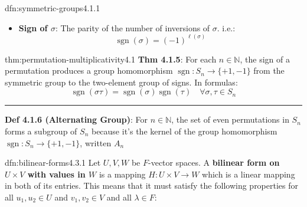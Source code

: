 \documentclass[landscape, 8pt]{extarticle}
\DeclareMathOperator{\sgn}{sgn}
\DeclareMathOperator{\Mat}{Mat}
\begin{document}
\begin{multicols}{3}
\begin{dfn}{dfn:symmetric-groups}{4.1.1}
\begin{itemize}[leftmargin=*]
        \item \textbf{Sign of $\sigma$}: The parity of the number of inversions of $\sigma$. i.e.:
            \[\sgn(\sigma) = (-1)^{\ell(\sigma)}\]
    \end{itemize}
\end{dfn}

\vspace{-5pt}
\begin{thm}{thm:permutation-multiplicativity}{4.1}
    \vspace{-5pt}
    \textbf{Thm 4.1.5}: For each $n\in \mathbb{N}$, the sign of a permutation produces a group homomorphism $\sgn : S_{n} \to \{+1, -1\}$ from the symmetric group to the two-element group of signs. In formulas:
    \[\sgn(\sigma\tau) = \sgn(\sigma)\sgn(\tau) \quad \forall \sigma, \tau\in S_{n}\]

    \vspace{-5pt}
    \noindent\rule{\textwidth}{0.2pt}

    \textbf{Def 4.1.6 (Alternating Group)}: For $n\in \mathbb{N}$, the set of even permutations in $S_{n}$ forms a subgroup of $S_{n}$ because it's the kernel of the group homomorphism $\sgn : S_{n}\to \{+1, -1\}$, written $A_{n}$
\end{thm}

%
%

\vspace{-5pt}
\begin{dfn}{dfn:bilinear-forms}{4.3.1}
    \vspace{-5pt}
    Let $U,V,W$ be $F$-vector spaces. A \textbf{bilinear form on $U \times V$ with values in $W$} is a mapping $H: U \times V \to W $ which is a linear mapping in both of its entries. This means that it must satisfy the following properties for all $u_{1}, u_{2}\in U$ and $v_{1}, v_{2}\in V$ and all $\lambda\in F$:


\end{dfn}
\end{multicols}
\end{document}

